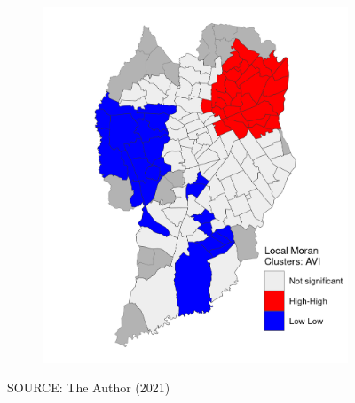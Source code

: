 \begin{figure}[!htbp]
\begin{subfigure}{0.5\textwidth}
        \includegraphics{fig/lisa_AVI.png}
    \end{subfigure}    
    \label{fig:gwr_avi}
    \par SOURCE: The Author (2021)
\end{figure}

